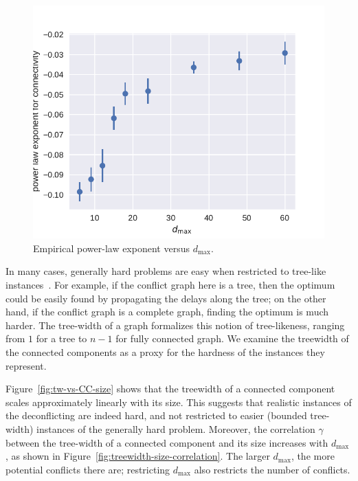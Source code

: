\begin{figure}[htpb]
\includegraphics[width=0.95\columnwidth]{pics/instances/connectivity_pl.pdf}
\caption[Power-law exponent vs. $d_{\max}$]{Empirical power-law exponent versus $d_{\max}$.}
\label{fig:exponent-vs-dmax}
\end{figure}

In many cases, generally hard problems are easy when restricted to tree-like instances~\cite{bertele1972, halin1976s}.
For example, if the conflict graph here is a tree, then the optimum could be easily found by propagating the delays along the tree;
on the other hand, if the conflict graph is a complete graph, finding the optimum is much harder.
The tree-width of a graph formalizes this notion of tree-likeness, ranging from $1$ for a tree to $n-1$ for fully connected graph.
We examine the treewidth of the connected components as a proxy for the hardness of the instances they represent.

Figure~\ref{fig:tw-vs-CC-size} shows that the treewidth of a connected component scales approximately linearly with its size.
This suggests that realistic instances of the deconflicting are indeed hard, and not restricted to easier (bounded tree-width) instances of the generally hard problem.
Moreover, the correlation $\gamma$ between the tree-width of a connected component and its size increases with $d_{\max}$, as shown in Figure~\ref{fig:treewidth-size-correlation}.
The larger $d_{\max}$, the more potential conflicts there are;
restricting $d_{\max}$ also restricts the number of conflicts.

